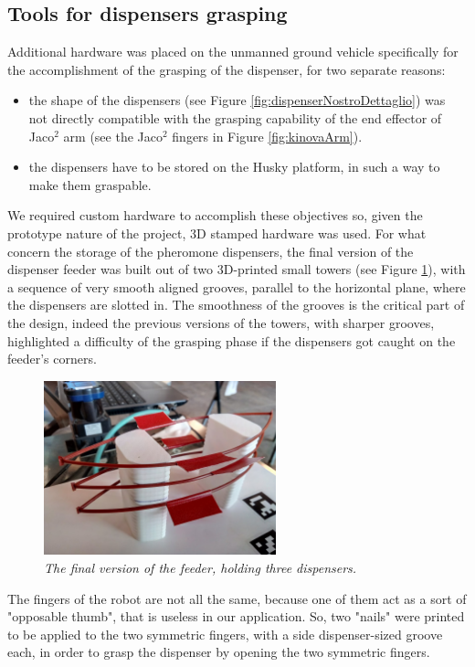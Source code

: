 \subsection{Tools for dispensers grasping}
Additional hardware was placed on the unmanned ground vehicle specifically for the accomplishment of the grasping of the dispenser, for two separate reasons:

\begin{itemize}
	\item the shape of the dispensers (see Figure \ref{fig:dispenserNostroDettaglio}) was not directly compatible with the grasping capability of the end effector of Jaco$^2$ arm (see the Jaco$^2$ fingers in Figure \ref{fig:kinovaArm}).
	\item the dispensers have to be stored on the Husky platform, in such a way to make them graspable.
\end{itemize}
We required custom hardware to accomplish these objectives so, given the prototype nature of the project, 3D stamped hardware was used.
For what concern the storage of the pheromone dispensers, the final version of the dispenser feeder was built out of two 3D-printed small towers (see Figure \ref{fig:dispenserFeeder}), with a sequence of very smooth aligned grooves, parallel to the horizontal plane, where the dispensers are slotted in. The smoothness of the grooves is the critical part of the design, indeed the previous versions of the towers, with sharper grooves, highlighted a difficulty of the grasping phase if the dispensers got caught on the feeder's corners.

\begin{figure}
	\centering
	\includegraphics[width=0.6\textwidth]{Images/grape_sw_hw_architecture/feederConDispenser.jpg}
	\caption{\textit{The final version of the feeder, holding three dispensers.}}
	\label{fig:dispenserFeeder}
\end{figure}


The fingers of the robot are not all the same, because one of them act as a sort of "opposable thumb", that is useless in our application. So, two "nails" were printed to be applied to the two symmetric fingers, with a side dispenser-sized groove each, in order to grasp the dispenser by opening the two symmetric fingers.

